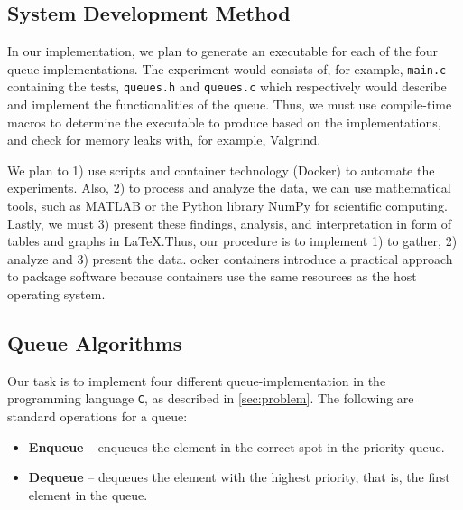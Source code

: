 \documentclass[a4paper,11pt]{kth-mag}
\newcommand*{\skippara}{\par\vspace{\baselineskip} \noindent}
\begin{document}
\subsection{System Development Method}
In our implementation, we plan to generate an executable for each of the four queue-implementations.
The experiment would consists of, for example, \texttt{main.c} containing the tests, \texttt{queues.h} and \texttt{queues.c} which respectively would describe and implement the functionalities of the queue.
Thus, we must use compile-time macros to determine the executable to produce based on the implementations, and check for memory leaks with, for example, Valgrind.

\skippara We plan to 1) use scripts and container technology (Docker) to automate the experiments.
Also, 2) to process and analyze the data, we can use mathematical tools, such as MATLAB or the Python library NumPy for scientific computing.
Lastly, we must 3) present these findings, analysis, and interpretation in form of tables and graphs in \LaTeX.\.
Thus, our procedure is to implement 1) to gather, 2) analyze and 3) present the data.
ocker containers introduce a practical approach to package software because containers use the same resources as the host operating system.

\subsection{Queue Algorithms}\label{sec:algorithms}
\skippara Our task is to implement four different queue-implementation in the programming language \texttt{C}, as described in \cref{sec:problem}.
The following are standard operations for a queue:
\begin{itemize}
    \item \textbf{Enqueue} -- enqueues the element in the correct spot in the priority queue.
    \item \textbf{Dequeue} -- dequeues the element with the highest priority, that is, the first element in the queue.
\end{itemize}
\end{document}
